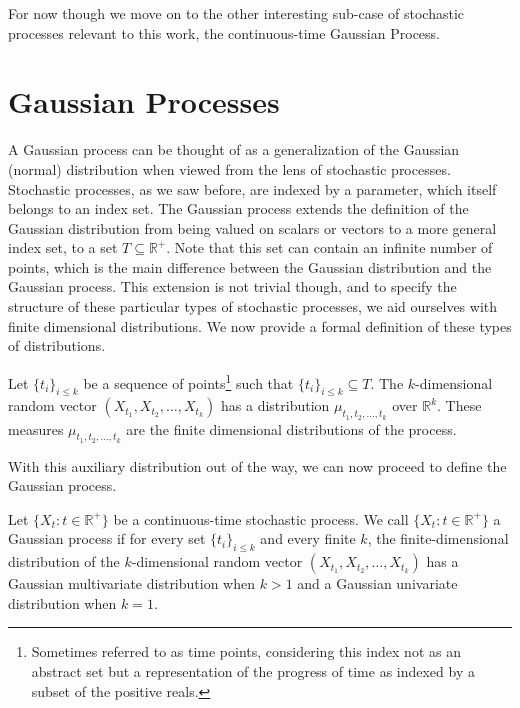For now though we move on to the other interesting sub-case of stochastic processes relevant to this work, the continuous-time Gaussian Process. 

\section{Gaussian Processes}

A Gaussian process can be thought of as a generalization of the Gaussian (normal) distribution when viewed from the lens of stochastic processes. Stochastic processes, as we saw before, are indexed by a parameter, which itself belongs to an index set. The Gaussian process extends the definition of the Gaussian distribution from being valued on scalars or vectors to a more general index set, to a set $T \subseteq \mathbb{R}^+$. Note that this set can contain an infinite number of points, which is the main difference between the Gaussian distribution and the Gaussian process. This extension is not trivial though, and to specify the structure of these particular types of stochastic processes, we aid ourselves with finite dimensional distributions. We now provide a formal definition of these types of distributions. 

\begin{definition}
	Let $\{ t_i \}_{i \leq k}$ be a sequence of points\footnote{Sometimes referred to as time points, considering this index not as an abstract set but a representation of the progress of time as indexed by a subset of the positive reals.} such that $\{ t_i \}_{i \leq k} \subseteq T$. The $k$-dimensional random vector $(X_{t_1}, X_{t_2}, \ldots, X_{t_k})$ has a distribution $\mu_{t_1, t_2, \ldots, t_k}$ over $\mathbb{R}^k$. These measures $\mu_{t_1, t_2, \ldots, t_k}$ are the finite dimensional distributions of the process. 
\end{definition}

With this auxiliary distribution out of the way, we can now proceed to define the Gaussian process. 

\begin{definition}
	Let $\{ X_t: t \in \mathbb{R}^+ \}$ be a continuous-time stochastic process. We call $\{ X_t: t \in \mathbb{R}^+ \}$ a Gaussian process if for every set $\{ t_i \}_{i \leq k}$ and every finite $k$, the finite-dimensional distribution of the $k$-dimensional random vector $(X_{t_1}, X_{t_2}, \ldots, X_{t_k})$ has a Gaussian multivariate distribution when $k>1$ and a Gaussian univariate distribution when $k=1$. 
\end{definition} 

